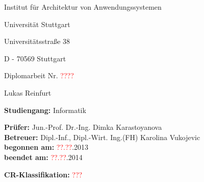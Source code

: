 \centerline{\large Institut für Architektur von Anwendungssystemen}
\vspace*{1em}
\centerline{\large Universität Stuttgart}
\centerline{\large Universitätsstraße 38}
\centerline{\large D - 70569 Stuttgart}

\vspace*{3.5cm}

\centerline{\large Diplomarbeit Nr. \textcolor{red}{????}}

\vspace*{0.5cm}

\centerline{\LARGE \textbf{\thesistitle}}

\vspace*{0.5cm}

\centerline{\large Lukas Reinfurt}

\vspace*{5.5cm}

\begingroup
\large
\noindent\textbf{Studiengang:} 	Informatik

\vspace*{1em}

\noindent\textbf{Prüfer:} Jun.-Prof. Dr.-Ing. Dimka Karastoyanova\\
\noindent\textbf{Betreuer:} Dipl.-Inf., Dipl.-Wirt. Ing.(FH) Karolina Vukojevic\\
\noindent\textbf{begonnen am:} \textcolor{red}{??.??}.2013\\
\noindent\textbf{beendet am:} \textcolor{red}{??.??}.2014\\

\vspace*{1em}

\noindent\textbf{CR-Klassifikation:} \textcolor{red}{???}
\endgroup

